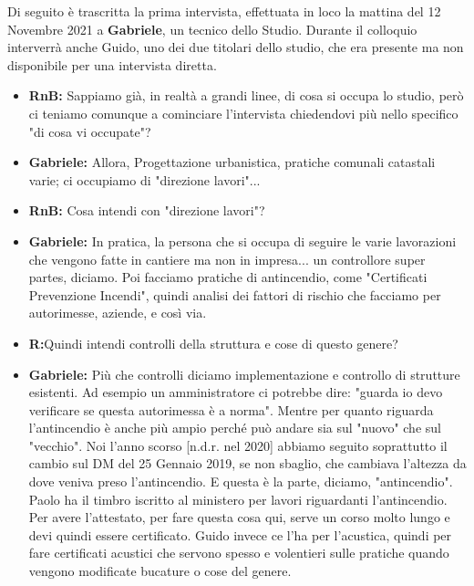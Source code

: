 \documentclass{elegantbook}
\begin{document}
	Di seguito è trascritta la prima intervista, effettuata in loco la mattina del 12 Novembre 2021 a \textbf{Gabriele}, un tecnico dello Studio.
        Durante il colloquio interverrà anche Guido, uno dei due titolari dello studio, che era presente ma non disponibile per una intervista diretta.
	
	\begin{itemize}
		\item\textbf{RnB}\textbf{:} Sappiamo già, in realtà a grandi linee, di cosa si occupa lo studio, però ci teniamo comunque a cominciare
                    l'intervista chiedendovi più nello specifico "di cosa vi occupate"?
		\item\textbf{Gabriele}\textbf{:} Allora, Progettazione urbanistica, pratiche comunali catastali varie; ci occupiamo di "direzione lavori"...
		\item\textbf{RnB}\textbf{:} Cosa intendi con "direzione lavori"?
		\item\textbf{Gabriele}\textbf{:} In pratica, la persona che si occupa di seguire le varie lavorazioni che vengono fatte in cantiere ma non in impresa...
                    un controllore super partes, diciamo.
                    Poi facciamo pratiche di antincendio, come "Certificati Prevenzione Incendi", quindi analisi dei fattori di rischio che facciamo per 
                    autorimesse, aziende, e così via.
		\item\textbf{R}\textbf{:}Quindi intendi controlli della struttura e cose di questo genere?
		\item\textbf{Gabriele}\textbf{:} Più che controlli diciamo implementazione e controllo di strutture esistenti. Ad esempio un amministratore ci potrebbe dire:
                    "guarda io devo verificare se questa autorimessa è a norma". Mentre per quanto riguarda l'antincendio è anche più ampio perché può andare sia sul "nuovo"
                    che sul "vecchio". Noi l'anno scorso [n.d.r. nel 2020] abbiamo seguito soprattutto il cambio sul DM del 25 Gennaio 2019, se non sbaglio,
                    che cambiava l'altezza da dove veniva preso l'antincendio.
                    E questa è la parte, diciamo, "antincendio".
                    Paolo ha il timbro iscritto al ministero per lavori riguardanti l'antincendio. Per avere l'attestato, per fare questa cosa qui,
                    serve un corso molto lungo e devi quindi essere certificato. Guido invece ce l'ha per l'acustica, quindi per fare certificati acustici che servono spesso
                    e volentieri sulle pratiche quando vengono modificate bucature o cose del genere.

\end{itemize}
\end{document}
